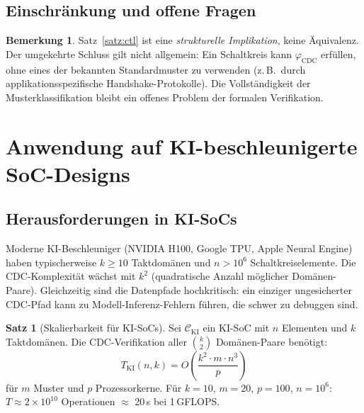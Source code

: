﻿\documentclass[a4paper,12pt]{article}
\theoremstyle{definition}
\newtheorem{satz}{Satz}
\newtheorem{bemerkung}{Bemerkung}
\begin{document}
	\subsection{Einschr\"ankung und offene Fragen}
	
	\begin{bemerkung}
		Satz~\ref{satz:ctl} ist eine \emph{strukturelle Implikation}, keine
		\"Aquivalenz. Der umgekehrte Schluss gilt nicht allgemein: Ein Schaltkreis
		kann $\varphi_{\mathrm{CDC}}$ erf\"ullen, ohne eines der bekannten
		Standardmuster zu verwenden (z.\,B.\ durch applikationsspezifische
		Handshake-Protokolle). Die Vollst\"andigkeit der Musterklassifikation
		bleibt ein offenes Problem der formalen Verifikation.
	\end{bemerkung}
	
	\section{Anwendung auf KI-beschleunigerte SoC-Designs}
	
	\subsection{Herausforderungen in KI-SoCs}
	
	Moderne KI-Beschleuniger (NVIDIA H100, Google TPU, Apple Neural Engine)
	haben typischerweise $k \geq 10$ Taktdom\"anen und $n > 10^6$ Schaltkreiselemente.
	Die CDC-Komplexit\"at w\"achst mit $k^2$ (quadratische Anzahl m\"oglicher
	Dom\"anen-Paare). Gleichzeitig sind die Datenpfade hochkritisch:
	ein einziger ungesicherter CDC-Pfad kann zu Modell-Inferenz-Fehlern
	f\"uhren, die schwer zu debuggen sind.
	
	\begin{satz}[Skalierbarkeit f\"ur KI-SoCs]
		\label{satz:skalierbarkeit}
		Sei $\mathcal{C}_{\mathrm{KI}}$ ein KI-SoC mit $n$ Elementen und
		$k$ Taktdom\"anen. Die CDC-Verifikation aller $\binom{k}{2}$ Dom\"anen-Paare
		ben\"otigt:
		\[
		T_{\mathrm{KI}}(n, k) = O\!\left(\frac{k^2 \cdot m \cdot n^3}{p}\right)
		\]
		f\"ur $m$ Muster und $p$ Prozessorkerne.
		F\"ur $k = 10$, $m = 20$, $p = 100$, $n = 10^6$:
		$T \approx 2 \times 10^{10}$ Operationen $\approx$ 20\,s bei 1\,GFLOPS.
	\end{satz}
	
\end{document}
